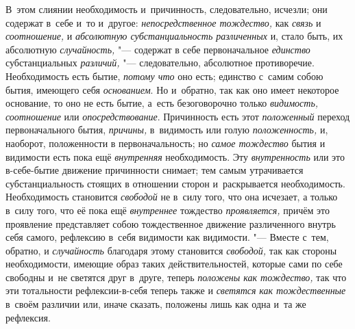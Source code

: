 \label{bkm:bm93a}В~этом слиянии необходимость и~причинность, следовательно,
исчезли; они содержат в~себе и~то и~другое:
{\em непосредственное тождество,} как
{\em связь} и {\em соотношение,} и
{\em абсолютную субстанциальность различенных} и, стало
быть, их абсолютную {\em случайность,} "--- содержат в
себе первоначальное {\em единство} субстанциальных
{\em различий,} "--- следовательно, абсолютное
противоречие. Необходимость есть бытие, {\em потому
что} оно есть; единство с~самим собою бытия, имеющего себя
{\em основанием}. Но и~обратно, так как оно имеет
некоторое основание, то оно не есть бытие, а~есть безоговорочно только
{\em видимость, соотношение} или
{\em опосредствование}. Причинность есть этот
{\em положенный} переход первоначального бытия,
{\em причины,} в~видимость или голую
{\em положенность,} и, наоборот, положенности в
первоначальность; но {\em самое тождество} бытия и
видимости есть пока ещё {\em внутренняя} необходимость.
Эту {\em внутренность} или это в-себе-бытие движение
причинности снимает; тем самым утрачивается субстанциальность стоящих в
отношении сторон и~раскрывается необходимость. Необходимость становится
{\em свободой} не в~силу того, что она исчезает, а
только в~силу того, что её пока ещё {\em внутреннее}
тождество {\em проявляется,} причём это проявление
представляет собою тождественное движение различенного внутрь себя самого,
рефлексию в~себя видимости как видимости. "--- Вместе с~тем, обратно, и
{\em случайность} благодаря этому становится
{\em свободой,} так как стороны необходимости, имеющие
образ таких действительностей, которые сами по себе свободны и~не светятся
друг в~друге, теперь {\em положены как тождество,} так
что эти тотальности рефлексии-в-себя теперь также и
{\em светятся} {\em как
тождественные} в~своём различии или, иначе сказать, положены лишь как одна
и~та же рефлексия.

